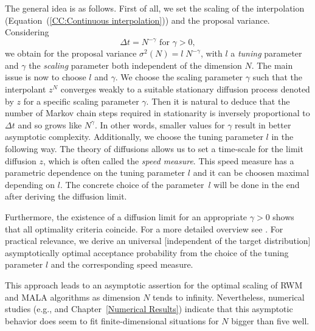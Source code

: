 The general idea is as follows. First of all, we set the scaling of the interpolation (Equation~(\ref{CC:Continuous interpolation})) and the proposal variance. Considering 
\begin{equation}
\label{CC:Choice of scaling gamma}
  \Delta t = N^{-\gamma} \text{ for } \gamma > 0,                                                                                                                                                                                                                                                                                                                       \end{equation}
we obtain for the proposal variance $ \sigma^2 (N) = l\;N^{-\gamma} $, with $l$ a \textit{tuning} parameter and $ \gamma $ the \textit{scaling} parameter both independent of the dimension $N$. The main issue is now to choose $l$ and $\gamma$. We choose the scaling parameter $\gamma$ such that the interpolant $ z^{N} $ converges weakly to a suitable stationary diffusion process denoted by $z$ for a specific scaling parameter $\gamma$. Then it is natural to deduce that the number of Markov chain steps required in stationarity is inversely proportional to $ \Delta t $ and so grows like $ N^{\gamma} $. In other words, smaller values for $\gamma$ result in better asymptotic complexity. Additionally, we choose the tuning parameter $l$ in the following way. The theory of diffusions allows us to set a time-scale for the limit diffusion $z$, which is often called the \textit{speed measure}. This speed measure has a parametric dependence on the tuning parameter $l$ and it can be choosen maximal depending on $l$. The concrete choice of the parameter~$l$ will be done in the end after deriving the diffusion limit.

Furthermore, the existence of a diffusion limit for an appropriate $ \gamma > 0 $ shows that all optimality criteria coincide. For a more detailed overview see \autocite{Beskos2009}. For practical relevance, we derive an universal [independent of the target distribution] asymptotically optimal acceptance probability from the choice of the tuning parameter $l$ and the corresponding speed measure.

\begin{rem}
\label{rem:finite dimension}
 This approach leads to an asymptotic assertion for the optimal scaling of RWM and MALA algorithms as dimension $N$ tends to infinity. Nevertheless, numerical studies (e.g., \autocite{Gelman1996, Roberts2001} and Chapter~\ref{Numerical Results}) indicate that this asymptotic behavior does seem to fit finite-dimensional situations for $N$ bigger than five well.
\end{rem}

